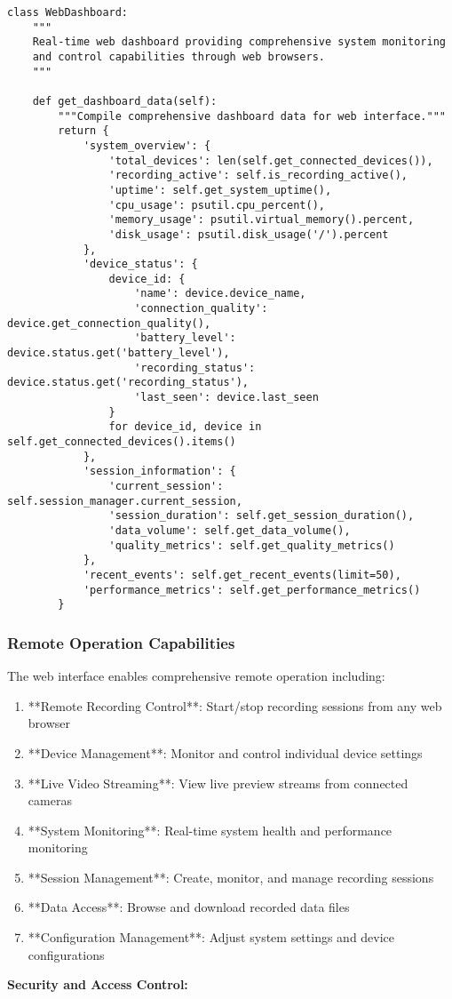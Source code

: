 \documentclass[11pt,a4paper]{article}
\begin{document}
\begin{verbatim}
class WebDashboard:
    """
    Real-time web dashboard providing comprehensive system monitoring
    and control capabilities through web browsers.
    """

    def get_dashboard_data(self):
        """Compile comprehensive dashboard data for web interface."""
        return {
            'system_overview': {
                'total_devices': len(self.get_connected_devices()),
                'recording_active': self.is_recording_active(),
                'uptime': self.get_system_uptime(),
                'cpu_usage': psutil.cpu_percent(),
                'memory_usage': psutil.virtual_memory().percent,
                'disk_usage': psutil.disk_usage('/').percent
            },
            'device_status': {
                device_id: {
                    'name': device.device_name,
                    'connection_quality': device.get_connection_quality(),
                    'battery_level': device.status.get('battery_level'),
                    'recording_status': device.status.get('recording_status'),
                    'last_seen': device.last_seen
                }
                for device_id, device in self.get_connected_devices().items()
            },
            'session_information': {
                'current_session': self.session_manager.current_session,
                'session_duration': self.get_session_duration(),
                'data_volume': self.get_data_volume(),
                'quality_metrics': self.get_quality_metrics()
            },
            'recent_events': self.get_recent_events(limit=50),
            'performance_metrics': self.get_performance_metrics()
        }
\end{verbatim}

\subsubsection{Remote Operation Capabilities}

The web interface enables comprehensive remote operation including:

\begin{enumerate}
\item **Remote Recording Control**: Start/stop recording sessions from any web browser
\item **Device Management**: Monitor and control individual device settings
\item **Live Video Streaming**: View live preview streams from connected cameras
\item **System Monitoring**: Real-time system health and performance monitoring
\item **Session Management**: Create, monitor, and manage recording sessions
\item **Data Access**: Browse and download recorded data files
\item **Configuration Management**: Adjust system settings and device configurations

\end{enumerate}
\textbf{Security and Access Control:}
\end{document}
